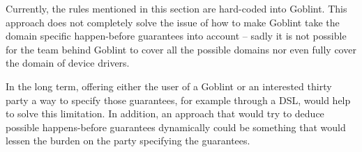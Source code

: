\documentclass[..thesis.tex]{subfiles}
\begin{document}
Currently, the rules mentioned in this section are hard-coded into Goblint. This approach does not completely solve the issue of how to make Goblint take the domain specific happen-before
guarantees into account -- sadly it is not possible for the team behind Goblint to cover all the possible domains nor even fully cover the domain of device drivers.

In the long term, offering either the user of a Goblint or an interested thirty party a way to specify those guarantees,
for example through a DSL,  would help to solve this limitation. In addition, an approach that would try to deduce possible happens-before guarantees dynamically 
could be something that would lessen the burden on the party specifying the guarantees.

\end{document}
